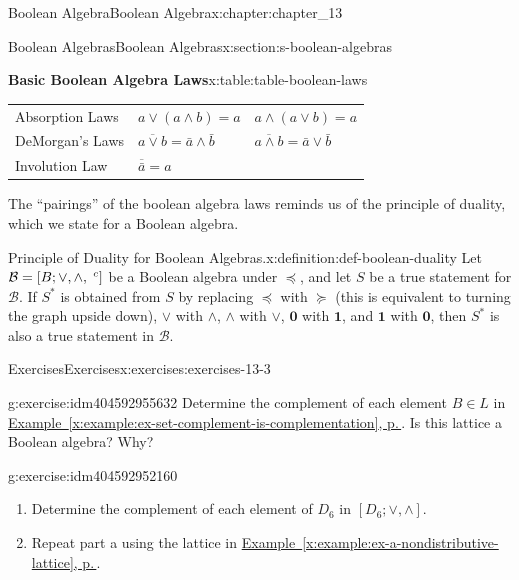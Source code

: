 \documentclass[twoside,10pt,]{book}
\newcommand{\xreffont}{\relax}
\numberwithin{equation}{section}
\begin{document}
\begin{chapterptx}{Boolean Algebra}{}{Boolean Algebra}{}{}{x:chapter:chapter_13}
\begin{sectionptx}{Boolean Algebras}{}{Boolean Algebras}{}{}{x:section:s-boolean-algebras}
\begin{tableptx}{\textbf{Basic Boolean Algebra Laws}}{x:table:table-boolean-laws}{}
{\begin{tabular}{lll}
Absorption Laws&\(a \lor  (a \land  b) = a\)&\(a \land  (a \lor  b) = a \)\tabularnewline[0pt]
DeMorgan's Laws&\(\overline{a \lor  b} = \bar{a} \land  \bar{b}\)&\(\overline{a \land  b} = \bar{a} \lor  \bar{b} \)\tabularnewline[0pt]
Involution Law&\(\overline{\bar{a}} = a\)&\(\quad\)
\end{tabular}
}%
\end{tableptx}%
The ``pairings'' of the boolean algebra laws reminds us of the principle of duality, which we state for a Boolean algebra.%
\begin{definition}{Principle of Duality for Boolean Algebras.}{x:definition:def-boolean-duality}%
%
\label{g:notation:idm404592964912}%
Let \(\mathcal{B}=[B; \lor, \land, \hspace{1 mm}^c]\) be a Boolean algebra under  \(\preceq\), and let \(S\) be a true statement for  \(\mathcal{B}\). If  \(S^*\) is obtained from \(S\) by replacing  \(\preceq\) with \(\succeq\) (this is equivalent to turning the graph upside down),  \(\lor\) with  \(\land\), \(\land\)  with  \(\lor\), \(\pmb{0}\) with \(\pmb{1}\), and \(\pmb{1}\) with \(\pmb{0}\), then \(S^*\) is also a true statement in  \(\mathcal{B}\).%
\end{definition}
%
%
\typeout{************************************************}
\typeout{************************************************}
%
\begin{exercises-subsection}{Exercises}{}{Exercises}{}{}{x:exercises:exercises-13-3}
\begin{divisionexercise}{1}{}{}{g:exercise:idm404592955632}%
Determine the complement of each element \(B \in  L\) in \hyperref[x:example:ex-set-complement-is-complementation]{Example~{\xreffont\ref{x:example:ex-set-complement-is-complementation}}, p.\,\pageref{x:example:ex-set-complement-is-complementation}}. Is this lattice a Boolean algebra? Why?%
\end{divisionexercise}%
\begin{divisionexercise}{2}{}{}{g:exercise:idm404592952160}%
%
\begin{enumerate}[label=(\alph*)]
\item{}Determine the complement of each element of \(D_6\) in \(\left[D_6; \lor , \land \right]\).%
\item{}Repeat part a using the lattice in \hyperref[x:example:ex-a-nondistributive-lattice]{Example~{\xreffont\ref{x:example:ex-a-nondistributive-lattice}}, p.\,\pageref{x:example:ex-a-nondistributive-lattice}}.%

\end{enumerate}
\end{divisionexercise}
\end{exercises-subsection}
\end{sectionptx}
\end{chapterptx}
\end{document}

